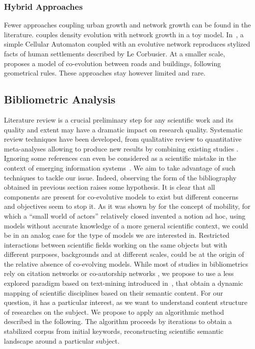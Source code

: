 \subsubsection{Hybrid Approaches}

Fewer approaches coupling urban growth and network growth can be found in the literature. \cite{barthelemy2009co} couples density evolution with network growth in a toy model. In~\cite{raimbault2014hybrid}, a simple Cellular Automaton coupled with an evolutive network reproduces stylized facts of human settlements described by Le Corbusier. At a smaller scale, \cite{achibet2014model} proposes a model of co-evolution between roads and buildings, following geometrical rules. These approaches stay however limited and rare.


\subsection{Bibliometric Analysis}

Literature review is a crucial preliminary step for any scientific work and its quality and extent may have a dramatic impact on research quality. Systematic review techniques have been developed, from qualitative review to quantitative meta-analyses allowing to produce new results by combining existing studies \cite{rucker2012network}. Ignoring some references can even be considered as a scientific mistake in the context of emerging information systems~\cite{lissacksubliminal}. We aim to take advantage of such techniques to tackle our issue.
Indeed, observing the form of the bibliography obtained in previous section raises some hypothesis. It is clear that all components are present for co-evolutive models to exist but different concerns and objectives seem to stop it. As it was shown by \cite{commenges:tel-00923682} for the concept of mobility, for which a ``small world of actors'' relatively closed invented a notion ad hoc, using models without accurate knowledge of a more general scientific context, we could be in an analog case for the type of models we are interested in. Restricted interactions between scientific fields working on the same objects but with different purposes, backgrounds and at different scales, could be at the origin of the relative absence of co-evolving models. 
While most of studies in bibliometrics rely on citation networks \cite{2013arXiv1310.8220N} or co-autorship networks \cite{2014arXiv1402.7268S}, we propose to use a less explored paradigm based on text-mining introduced in~\cite{chavalarias2013phylomemetic}, that obtain a dynamic mapping of scientific disciplines based on their semantic content. For our question, it has a particular interest, as we want to understand content structure of researches on the subject. We propose to apply an algorithmic method described in the following. The algorithm proceeds by iterations to obtain a stabilized corpus from initial keywords, reconstructing scientific semantic landscape around a particular subject.

